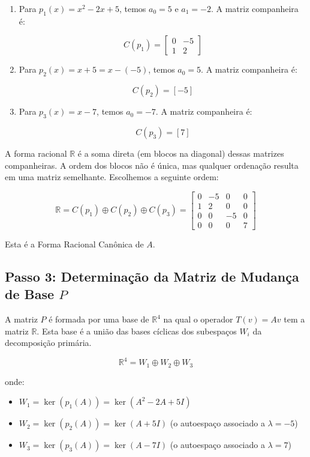 \begin{enumerate}
\item Para $p_1(x) = x^2 - 2x + 5$, temos $a_0 = 5$ e $a_1 = -2$. A matriz companheira é:

\[
C(p_1) =
\begin{bmatrix}
0 & -5 \\
1 & 2
\end{bmatrix}
\]

\item Para $p_2(x) = x+5 = x - (-5)$, temos $a_0 = 5$. A matriz companheira é:

\[
C(p_2) = [-5]
\]

\item Para $p_3(x) = x-7$, temos $a_0 = -7$. A matriz companheira é:

\[
C(p_3) = [7]
\]
\end{enumerate}

A forma racional $\mathbb{R}$ é a soma direta (em blocos na diagonal) dessas matrizes companheiras. A ordem
dos blocos não é única, mas qualquer ordenação resulta em uma matriz semelhante. Escolhemos a
seguinte ordem:

\[
\mathbb{R} = C(p_1)\oplus C(p_2)\oplus C(p_3) =
\begin{bmatrix}
0 & -5 & 0 & 0 \\
1 & 2 & 0 & 0 \\
0 & 0 & -5 & 0 \\
0 & 0 & 0 & 7
\end{bmatrix}
\]

Esta é a Forma Racional Canônica de $A$.

\subsection*{Passo 3: Determinação da Matriz de Mudança de Base $P$}

A matriz $P$ é formada por uma base de $\mathbb{R}^4$ na qual o operador $T(v)=Av$ tem a matriz $\mathbb{R}$. Esta
base é a união das bases cíclicas dos subespaços $W_i$ da decomposição primária.

\[
\mathbb{R}^4 = W_1 \oplus W_2 \oplus W_3
\]

onde:

\begin{itemize}
\item $W_1 = \ker(p_1(A)) = \ker(A^2 - 2A + 5I)$
\item $W_2 = \ker(p_2(A)) = \ker(A+5I)$ (o autoespaço associado a $\lambda = -5$)
\item $W_3 = \ker(p_3(A)) = \ker(A-7I)$ (o autoespaço associado a $\lambda = 7$)
\end{itemize}

